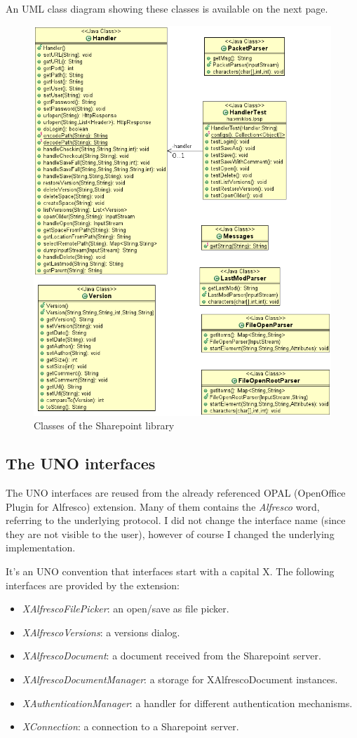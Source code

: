 An UML class diagram showing these classes is available on the next page.

\begin{figure}[p]
\centering
\includegraphics[width=425px,keepaspectratio]{design-splib.png}
\caption{Classes of the Sharepoint library}
\end{figure}

\subsection{The UNO interfaces}

The UNO interfaces are reused from the already referenced OPAL (OpenOffice
Plugin for Alfresco) extension. Many of them contains the \emph{Alfresco} word,
referring to the underlying protocol. I did not change the interface name
(since they are not visible to the user), however of course I changed the
underlying implementation.

It's an UNO convention that interfaces start with a capital X. The following
interfaces are provided by the extension:

\begin{itemize}
\item \emph{XAlfrescoFilePicker}: an open/save as file picker.
\item \emph{XAlfrescoVersions}: a versions dialog.
\item \emph{XAlfrescoDocument}: a document received from the
Sharepoint server.
\item \emph{XAlfrescoDocumentManager}: a storage for XAlfrescoDocument instances.
\item \emph{XAuthenticationManager}: a handler for different authentication mechanisms.
\item \emph{XConnection}: a connection to a Sharepoint server.
\end{itemize}

